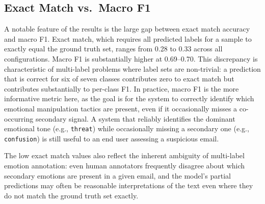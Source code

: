 \begin{table}[htbp]
\centering
\caption[Emotion detection results on the held-out test set]{Emotion detection results on the held-out test set. EM denotes Exact Match accuracy. All macro metrics are computed across the seven consolidated emotion classes.}
\label{tab:results_emotion_full}
\end{table}

\subsection{Exact Match vs.\ Macro F1}

A notable feature of the results is the large gap between exact match accuracy and macro F1. Exact match, which requires all predicted labels for a sample to exactly equal the ground truth set, ranges from 0.28 to 0.33 across all configurations. Macro F1 is substantially higher at 0.69--0.70. This discrepancy is characteristic of multi-label problems where label sets are non-trivial: a prediction that is correct for six of seven classes contributes zero to exact match but contributes substantially to per-class F1. In practice, macro F1 is the more informative metric here, as the goal is for the system to correctly identify which emotional manipulation tactics are present, even if it occasionally misses a co-occurring secondary signal. A system that reliably identifies the dominant emotional tone (e.g., \texttt{threat}) while occasionally missing a secondary one (e.g., \texttt{confusion}) is still useful to an end user assessing a suspicious email.

The low exact match values also reflect the inherent ambiguity of multi-label emotion annotation: even human annotators frequently disagree about which secondary emotions are present in a given email, and the model's partial predictions may often be reasonable interpretations of the text even where they do not match the ground truth set exactly.

